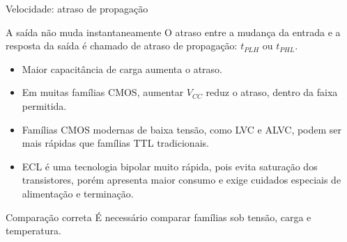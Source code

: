 \begin{frame}{Velocidade: atraso de propagação}
    \begin{block}{A saída não muda instantaneamente}
        O atraso entre a mudança da entrada e a resposta da saída é chamado de
        atraso de propagação: $t_{PLH}$ ou $t_{PHL}$.
    \end{block}

    \begin{itemize}
        \item Maior capacitância de carga aumenta o atraso.
        \item Em muitas famílias CMOS, aumentar $V_{CC}$ reduz o atraso, dentro
              da faixa permitida.
        \item Famílias CMOS modernas de baixa tensão, como LVC e ALVC, podem ser
              mais rápidas que famílias TTL tradicionais.
        \item ECL é uma tecnologia bipolar muito rápida, pois evita saturação
              dos transistores, porém apresenta maior consumo e exige cuidados
              especiais de alimentação e terminação.
    \end{itemize}

    \begin{alertblock}{Comparação correta}
        É necessário comparar famílias sob tensão, carga e temperatura.
    \end{alertblock}
\end{frame}
